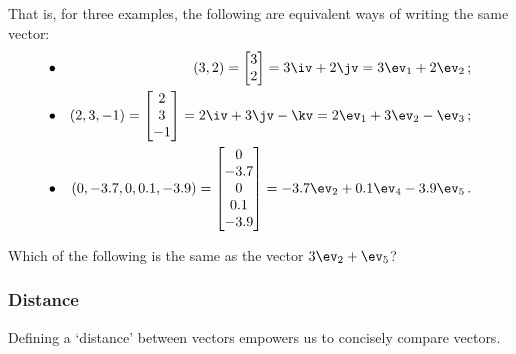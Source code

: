 That is, for three examples, the following are equivalent ways of writing the same vector:
\begin{eqnarray*}\bullet&&
(3,2)=\begin{bmatrix} 3\\2 \end{bmatrix}=3\iv+2\jv=3\ev_1+2\ev_2\,;
\\\bullet&&
(2,3,-1)=\begin{bmatrix} 2\\3\\-1 \end{bmatrix}
=2\iv+3\jv-\kv=2\ev_1+3\ev_2-\ev_3\,;
\\\bullet&&
(0,-3.7,0,0.1,-3.9)
=\begin{bmatrix} 0\\-3.7\\0\\0.1\\-3.9 \end{bmatrix}
=-3.7\ev_2+0.1\ev_4-3.9\ev_5\,.
\end{eqnarray*}




\begin{activity}
Which of the following is the same as the vector \(3\ev_2+\ev_5\)?
\end{activity}




\subsubsection{Distance}
Defining a `distance' between vectors empowers us to concisely compare vectors.

